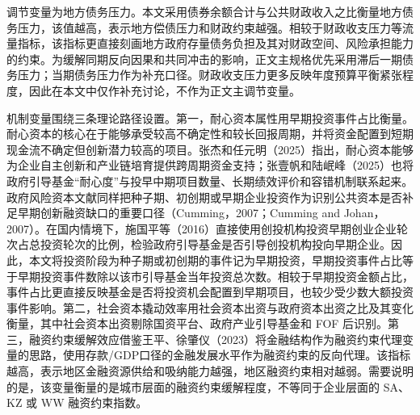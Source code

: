 调节变量为地方债务压力。本文采用债券余额合计与公共财政收入之比衡量地方债务压力，该值越高，表示地方偿债压力和财政约束越强。相较于财政收支压力等流量指标，该指标更直接刻画地方政府存量债务负担及其对财政空间、风险承担能力的约束。为缓解同期反向因果和共同冲击的影响，正文主规格优先采用滞后一期债务压力；当期债务压力作为补充口径。财政收支压力更多反映年度预算平衡紧张程度，因此在本文中仅作补充讨论，不作为正文主调节变量。

机制变量围绕三条理论路径设置。第一，耐心资本属性用早期投资事件占比衡量。耐心资本的核心在于能够承受较高不确定性和较长回报周期，并将资金配置到短期现金流不确定但创新潜力较高的项目。张杰和任元明（2025）指出，耐心资本能够为企业自主创新和产业链培育提供跨周期资金支持；张壹帆和陆岷峰（2025）也将政府引导基金“耐心度”与投早中期项目数量、长期绩效评价和容错机制联系起来。政府风险资本文献同样把种子期、初创期或早期企业投资作为识别公共资本是否补足早期创新融资缺口的重要口径（Cumming，2007；Cumming and Johan，2007）。在国内情境下，施国平等（2016）直接使用创投机构投资早期创业企业轮次占总投资轮次的比例，检验政府引导基金是否引导创投机构投向早期企业。因此，本文将投资阶段为种子期或初创期的事件记为早期投资，早期投资事件占比等于早期投资事件数除以该市引导基金当年投资总次数。相较于早期投资金额占比，事件占比更直接反映基金是否将投资机会配置到早期项目，也较少受少数大额投资事件影响。第二，社会资本撬动效率用社会资本出资与政府资本出资之比及其变化衡量，其中社会资本出资剔除国资平台、政府产业引导基金和 FOF 后识别。第三，融资约束缓解效应借鉴王平、徐肇仪（2023）将金融结构作为融资约束代理变量的思路，使用存款/GDP口径的金融发展水平作为融资约束的反向代理。该指标越高，表示地区金融资源供给和吸纳能力越强，地区融资约束相对越弱。需要说明的是，该变量衡量的是城市层面的融资约束缓解程度，不等同于企业层面的 SA、KZ 或 WW 融资约束指数。

